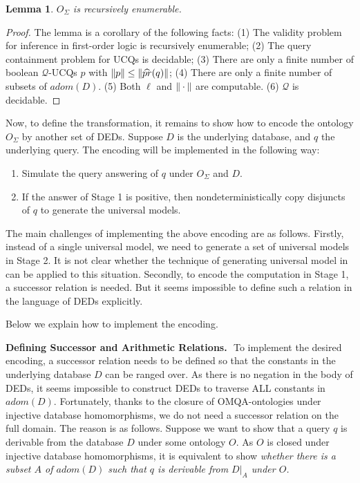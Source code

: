 \documentclass[letterpaper]{article} %
\newtheorem{lem}[thm]{Lemma}
\theoremstyle{definition}
\theoremstyle{remark}
\theoremstyle{definition}
\begin{document}
\begin{lem}
$O_\Sigma$ is recursively enumerable. 
\end{lem}

\begin{proof}
The lemma is a corollary of the following facts:
(1) The validity problem for inference in first-order logic is recursively enumerable;
(2) The query containment problem for UCQs is decidable;
(3) There are only a finite number of boolean $\mathscr{Q}$-UCQs $p$ with $\dl p\dl\le\dl\widehat{pr}(q)\dl$; 
(4) There are only a finite number of subsets of $adom(D)$.
(5) Both $\ell$ and $\dl\cdot\dl$ are computable.
(6) $\mathcal{Q}$ is decidable.
\end{proof}

Now, to define the transformation, it remains to show how to encode the ontology $O_\Sigma$ by another set of DEDs. Suppose $D$ is the underlying database, and $q$ the underlying query. The encoding will be implemented in the following way: 
\begin{enumerate}
\item Simulate the query answering of $q$ under $O_\Sigma$ and $D$.
\item If the answer of Stage 1 is positive, then nondeterministically copy disjuncts of $q$ to generate the universal models. 
\end{enumerate}

The main challenges of implementing the above encoding are as follows. Firstly, instead of a single universal model, we need to generate a set of universal models in Stage 2. It is not clear whether the technique of generating universal model in~\cite{ZhangZY16} can be applied to this situation. Secondly, to encode the computation in Stage 1, a successor relation is needed. But it seems  impossible to define such a relation in the language of DEDs explicitly. 

Below we explain how to implement the encoding.

\medskip
{\noindent\bf Defining Successor and Arithmetic Relations.\,\,} 
To implement the desired encoding, a successor relation needs to be defined so that the constants in the underlying database $D$ can be ranged over. 
As there is no negation in the body of DEDs, it seems impossible to construct DEDs to traverse ALL constants in $adom(D)$. Fortunately, thanks to the closure of OMQA-ontologies under injective database homomorphisms, we do not need a successor relation on the full domain. The reason is as follows. Suppose we want to show that a query $q$ is derivable from the database $D$ under some ontology $O$. As $O$ is closed under injective database homomorphisms,  it is equivalent to show {\em whether there is a subset $A$ of $adom(D)$ such that $q$ is derivable from $D|_A$ under $O$.} 
\end{document}
